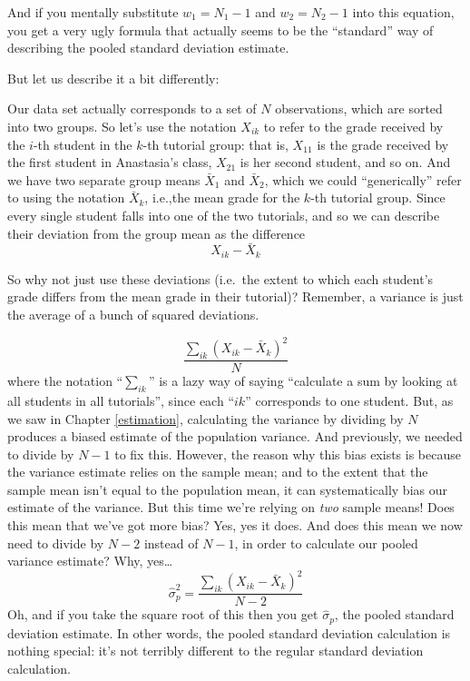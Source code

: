 \documentclass[
  11pt,
  a4paper,
  twoside,symmetric,openright]{book}
\theoremstyle{break}
\theoremstyle{break}
\begin{document}
And if you mentally substitute \(w_1 = N_1 -1\) and \(w_2 = N_2 -1\) into this equation, you get a very ugly formula that actually seems to be the ``standard'' way of describing the pooled standard deviation estimate.

But let us describe it a bit differently:

Our data set actually corresponds to a set of \(N\) observations, which are sorted into two groups. So let's use the notation \(X_{ik}\) to refer to the grade received by the \(i\)-th student in the \(k\)-th tutorial group: that is, \(X_{11}\) is the grade received by the first student in Anastasia's class, \(X_{21}\) is her second student, and so on. And we have two separate group means \(\bar{X}_1\) and \(\bar{X}_2\), which we could ``generically'' refer to using the notation \(\bar{X}_k\), i.e.,the mean grade for the \(k\)-th tutorial group. Since every single student falls into one of the two tutorials, and so we can describe their deviation from the group mean as the difference
\[
X_{ik} - \bar{X}_k
\]

So why not just use these deviations (i.e.~the extent to which each student's grade differs from the mean grade in their tutorial)? Remember, a variance is just the average of a bunch of squared deviations.

\[
\frac{\sum_{ik} \left( X_{ik} - \bar{X}_k \right)^2}{N}
\]
where the notation ``\(\sum_{ik}\)'' is a lazy way of saying ``calculate a sum by looking at all students in all tutorials'', since each ``\(ik\)'' corresponds to one student. But, as we saw in Chapter \ref{estimation}, calculating the variance by dividing by \(N\) produces a biased estimate of the population variance. And previously, we needed to divide by \(N-1\) to fix this. However, the reason why this bias exists is because the variance estimate relies on the sample mean; and to the extent that the sample mean isn't equal to the population mean, it can systematically bias our estimate of the variance. But this time we're relying on \emph{two} sample means! Does this mean that we've got more bias? Yes, yes it does. And does this mean we now need to divide by \(N-2\) instead of \(N-1\), in order to calculate our pooled variance estimate? Why, yes\ldots{}
\[
\hat\sigma^2_p = \frac{\sum_{ik} \left( X_{ik} - \bar{X}_k \right)^2}{N -2}
\]
Oh, and if you take the square root of this then you get \(\hat{\sigma}_p\), the pooled standard deviation estimate. In other words, the pooled standard deviation calculation is nothing special: it's not terribly different to the regular standard deviation calculation.
\end{document}
